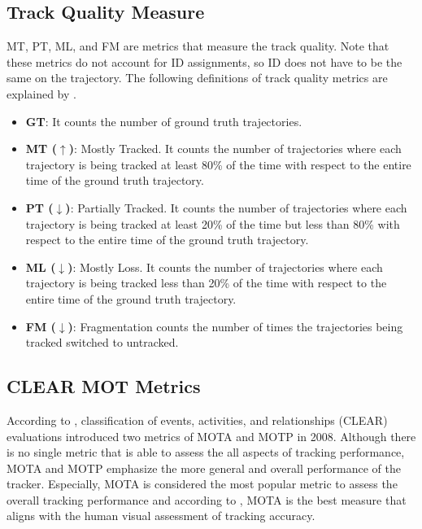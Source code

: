 \subsection{Track Quality Measure}
MT, PT, ML, and FM are metrics that measure the track quality. Note that these metrics do not account for ID assignments, so ID does not have to be the same on the trajectory. The following definitions of track quality metrics are explained by \cite{milan_mot16_2016}.

\begin{itemize}

\item \textbf{GT}: It counts the number of ground truth trajectories.

\item \textbf{MT ($\uparrow$)}: Mostly Tracked. It counts the number of trajectories where each trajectory is being tracked at least 80\% of the time with respect to the entire time of the ground truth trajectory.

\item \textbf{PT ($\downarrow$)}: Partially Tracked. It counts the number of trajectories where each trajectory is being tracked at least 20\% of the time but less than 80\% with respect to the entire time of the ground truth trajectory.

\item \textbf{ML ($\downarrow$)}: Mostly Loss. It counts the number of trajectories where each trajectory is being tracked less than 20\% of the time with respect to the entire time of the ground truth trajectory.

\item \textbf{FM ($\downarrow$)}: Fragmentation counts the number of times the trajectories being tracked switched to untracked.
\end{itemize}



\subsection{CLEAR MOT Metrics}
According to \cite{bernardin_evaluating_2008}, classification of events, activities, and relationships (CLEAR) evaluations introduced two metrics of MOTA and MOTP in 2008.
Although there is no single metric that is able to assess the all aspects of tracking performance, MOTA and MOTP emphasize the more general and overall performance of the tracker. Especially, MOTA is considered the most popular metric to assess the overall tracking performance \cite{milan_mot16_2016} and according to \cite{leal-taixe_tracking_2017}, MOTA is the best measure that aligns with the human visual assessment of tracking accuracy.

